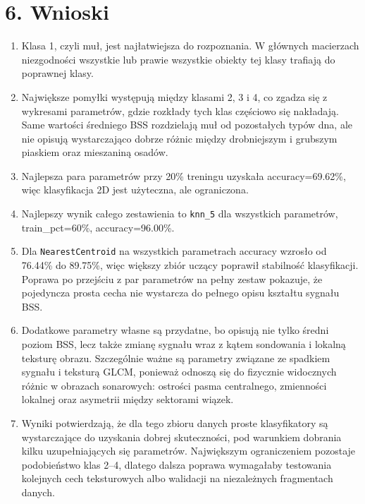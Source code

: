\documentclass[11pt,a4paper]{article}
\begin{document}
\section*{6. Wnioski}
\begin{enumerate}
    \item Klasa 1, czyli muł, jest najłatwiejsza do rozpoznania. W głównych macierzach niezgodności wszystkie lub prawie wszystkie obiekty tej klasy trafiają do poprawnej klasy.
    \item Największe pomyłki występują między klasami 2, 3 i 4, co zgadza się z wykresami parametrów, gdzie rozkłady tych klas częściowo się nakładają. Same wartości średniego BSS rozdzielają muł od pozostałych typów dna, ale nie opisują wystarczająco dobrze różnic między drobniejszym i grubszym piaskiem oraz mieszaniną osadów.
    \item Najlepsza para parametrów przy 20\% treningu uzyskała accuracy=69.62\%, więc klasyfikacja 2D jest użyteczna, ale ograniczona.
    \item Najlepszy wynik całego zestawienia to \texttt{knn\_5} dla wszystkich parametrów, train\_pct=60\%, accuracy=96.00\%.
    \item Dla \texttt{NearestCentroid} na wszystkich parametrach accuracy wzrosło od 76.44\% do 89.75\%, więc większy zbiór uczący poprawił stabilność klasyfikacji. Poprawa po przejściu z par parametrów na pełny zestaw pokazuje, że pojedyncza prosta cecha nie wystarcza do pełnego opisu kształtu sygnału BSS.
    \item Dodatkowe parametry własne są przydatne, bo opisują nie tylko średni poziom BSS, lecz także zmianę sygnału wraz z kątem sondowania i lokalną teksturę obrazu. Szczególnie ważne są parametry związane ze spadkiem sygnału i teksturą GLCM, ponieważ odnoszą się do fizycznie widocznych różnic w obrazach sonarowych: ostrości pasma centralnego, zmienności lokalnej oraz asymetrii między sektorami wiązek.
    \item Wyniki potwierdzają, że dla tego zbioru danych proste klasyfikatory są wystarczające do uzyskania dobrej skuteczności, pod warunkiem dobrania kilku uzupełniających się parametrów. Największym ograniczeniem pozostaje podobieństwo klas 2--4, dlatego dalsza poprawa wymagałaby testowania kolejnych cech teksturowych albo walidacji na niezależnych fragmentach danych.
\end{enumerate}
\end{document}
